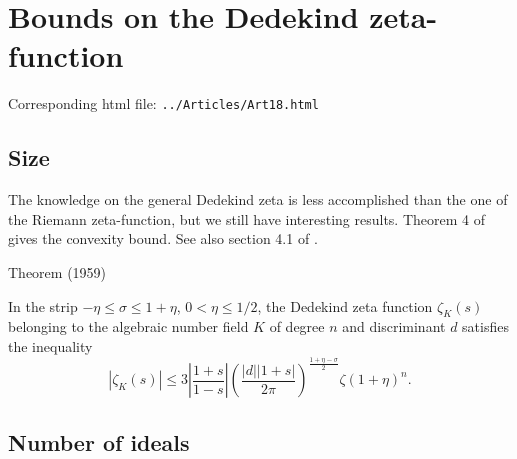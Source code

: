 \chapter{  Bounds on the Dedekind zeta-function}

Corresponding html file: \texttt{../Articles/Art18.html}










 
 


\par 
\section{Size }


The knowledge on the general Dedekind zeta is less accomplished than
the one of the Riemann zeta-function, but we still have interesting
results. Theorem 4 of \cite{Rademacher*59} gives
the convexity bound. See also section 4.1 of
\cite{Trudgian*13}.
\par 
\begin{thm}{Theorem (1959)}

In the strip $-\eta\le \sigma\le 1+\eta$, $0 < \eta\le 1/2$, the Dedekind zeta
function $\zeta_K(s)$ belonging to the algebraic number field $K$ of degree
$n$ and discriminant $d$ satisfies the inequality
$$
|\zeta_K(s)|\le 3 \left|\frac{1+s}{1-s}\right|
\left(\frac{|d||1+s|}{2\pi}\right)^{\frac{1+\eta-\sigma}{2}}
\zeta(1+\eta)^n.
$$
\end{thm}


\par 
\section{Number of ideals}


